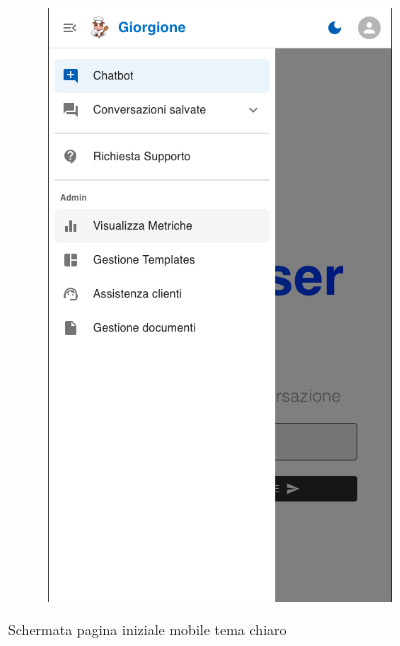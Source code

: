 \begin{figure}[h!]
\begin{subfigure}{0.3\textwidth}
        \includegraphics[width=\textwidth]{./img/layoutResponsive2White.png}
    \end{subfigure}
    \caption{Schermata pagina iniziale mobile tema chiaro}
\end{figure}

